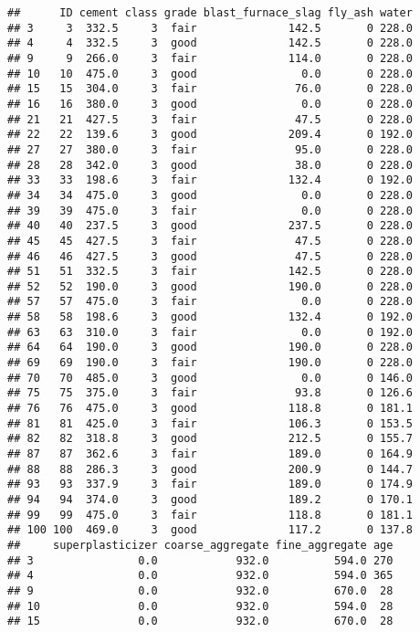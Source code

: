 \documentclass[]{article}
\begin{document}
\begin{verbatim}
##      ID cement class grade blast_furnace_slag fly_ash water
## 3     3  332.5     3  fair              142.5       0 228.0
## 4     4  332.5     3  good              142.5       0 228.0
## 9     9  266.0     3  fair              114.0       0 228.0
## 10   10  475.0     3  good                0.0       0 228.0
## 15   15  304.0     3  fair               76.0       0 228.0
## 16   16  380.0     3  good                0.0       0 228.0
## 21   21  427.5     3  fair               47.5       0 228.0
## 22   22  139.6     3  good              209.4       0 192.0
## 27   27  380.0     3  fair               95.0       0 228.0
## 28   28  342.0     3  good               38.0       0 228.0
## 33   33  198.6     3  fair              132.4       0 192.0
## 34   34  475.0     3  good                0.0       0 228.0
## 39   39  475.0     3  fair                0.0       0 228.0
## 40   40  237.5     3  good              237.5       0 228.0
## 45   45  427.5     3  fair               47.5       0 228.0
## 46   46  427.5     3  good               47.5       0 228.0
## 51   51  332.5     3  fair              142.5       0 228.0
## 52   52  190.0     3  good              190.0       0 228.0
## 57   57  475.0     3  fair                0.0       0 228.0
## 58   58  198.6     3  good              132.4       0 192.0
## 63   63  310.0     3  fair                0.0       0 192.0
## 64   64  190.0     3  good              190.0       0 228.0
## 69   69  190.0     3  fair              190.0       0 228.0
## 70   70  485.0     3  good                0.0       0 146.0
## 75   75  375.0     3  fair               93.8       0 126.6
## 76   76  475.0     3  good              118.8       0 181.1
## 81   81  425.0     3  fair              106.3       0 153.5
## 82   82  318.8     3  good              212.5       0 155.7
## 87   87  362.6     3  fair              189.0       0 164.9
## 88   88  286.3     3  good              200.9       0 144.7
## 93   93  337.9     3  fair              189.0       0 174.9
## 94   94  374.0     3  good              189.2       0 170.1
## 99   99  475.0     3  fair              118.8       0 181.1
## 100 100  469.0     3  good              117.2       0 137.8
##     superplasticizer coarse_aggregate fine_aggregate age
## 3                0.0            932.0          594.0 270
## 4                0.0            932.0          594.0 365
## 9                0.0            932.0          670.0  28
## 10               0.0            932.0          594.0  28
## 15               0.0            932.0          670.0  28

\end{verbatim}
\end{document}
